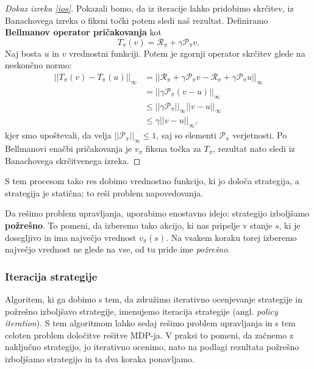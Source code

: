 \documentclass[12pt,a4paper]{amsart}
\theoremstyle{definition} %
\theoremstyle{plain} %
\begin{document}
\begin{proof}[Dokaz izreka \ref{ios}]
    Pokazali bomo, da iz iteracije lahko pridobimo skrčitev, iz Banachovega izreka o fiksni točki 
    potem sledi naš rezultat.
    Definiramo \textbf{Bellmanov operator pričakovanja} kot 
    $$
    T_\pi(v) = \mathcal{R}_\pi + \gamma \mathcal{P}_\pi v.
    $$
    Naj bosta $u$ in $v$ vrednostni funkciji. Potem je zgornji operator skrčitev glede na neskončno 
    normo: 
    \begin{align*}
        ||T_\pi(v) - T_\pi(u)||_\infty &= ||\mathcal{R}_\pi + \gamma \mathcal{P}_\pi v - 
                                            \mathcal{R}_\pi + \gamma \mathcal{P}_\pi u||_\infty \\  
        &= ||\gamma \mathcal{P}_\pi (v - u)||_\infty \\
        &\leq ||\gamma \mathcal{P}_\pi||_\infty ||v - u||_\infty \\
        &\leq \gamma ||v - u||_\infty,
    \end{align*}
    kjer smo upoštevali, da velja $||\mathcal{P}_\pi||_\infty \leq 1$, saj so elementi 
    $\mathcal{P}_\pi$ verjetnosti. Po Bellmanovi enačbi pričakovanja je $v_\pi$ fiksna točka 
    za $T_\pi$, rezultat nato sledi iz Banachovega skrčitvenega izreka.
\end{proof}

S tem procesom tako res dobimo vrednostno funkcijo, ki jo določa strategija, a strategija je 
statična; to reši problem napovedovanja. 

Da rešimo problem upravljanja, uporabimo enostavno idejo: strategijo izboljšamo \textbf{požrešno}. 
To pomeni, da izberemo tako akcijo, ki nas pripelje v stanje $s$, ki je dosegljivo in ima največjo 
vrednost $v_\pi(s)$. Na vsakem koraku torej izberemo največjo vrednost ne glede na vse, od tu pride 
ime \textit{požrešno}.

\subsubsection{Iteracija strategije}
Algoritem, ki ga dobimo s tem, da združimo iterativno ocenjevanje strategije in požrešno izboljšavo 
strategije, imenujemo iteracija strategije (angl. \textit{policy iteration}). S tem algoritmom 
lahko sedaj rešimo problem upravljanja in s tem celoten problem določitve rešitve MDP-ja. V praksi to pomeni, 
da začnemo z naključno strategijo, jo iterativno ocenimo, nato na podlagi rezultata požrešno izboljšamo 
strategijo in ta dva koraka ponavljamo.
\end{document}
